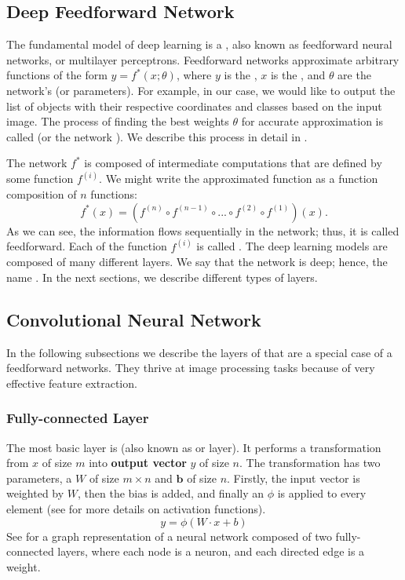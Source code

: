 \subsection{Deep Feedforward Network}
The fundamental model of deep learning is a , also
known as feedforward neural networks, or multilayer perceptrons. Feedforward
networks approximate arbitrary functions of the form $y = f^*(x;\theta)$, where
$y$ is the , $x$ is the , and $\theta$ are the network's
 (or parameters). For example, in our case, we would like to
output the list of objects with their respective coordinates and classes based
on the input image. The process of finding the best weights $\theta$ for
accurate approximation is called  (or the network ).
We describe this process in detail in .

The network $f^*$ is composed of intermediate computations that are defined by
some function $f^{(i)}$. We might write the approximated function as a function
composition of $n$ functions:
$$
    f^*(x) = (f^{(n)} \circ f^{(n-1)} \circ ... \circ f^{(2)} \circ f^{(1)})(x).
$$
As we can see, the information flows sequentially in the network; thus, it is
called feedforward. Each of the function $f^{(i)}$ is called . The
deep learning models are composed of many different layers. We say that the
network is deep; hence, the name . In the next sections, we
describe different types of layers.

\subsection{Convolutional Neural Network}
In the following subsections we describe the layers of  that are a special case of a feedforward networks. They thrive at
image processing tasks because of very effective feature extraction.

\subsubsection{Fully-connected Layer}
The most basic layer is  (also known as
 or  layer). It performs a transformation from
 $x$ of size $m$ into \textbf{output vector}
$y$ of size $n$. The transformation has two parameters, a
 $W$ of size $m \times n$ and 
$\boldsymbol{b}$ of size $n$. Firstly, the input vector is weighted by $W$, then
the bias is added, and finally an  $\phi$
is applied to every element (see  for more details on
activation functions).
$$
    y = \phi(W\cdot x + b)
$$
See  for a graph representation of a neural network composed
of two fully-connected layers, where each node is a neuron, and each directed
edge is a weight.

